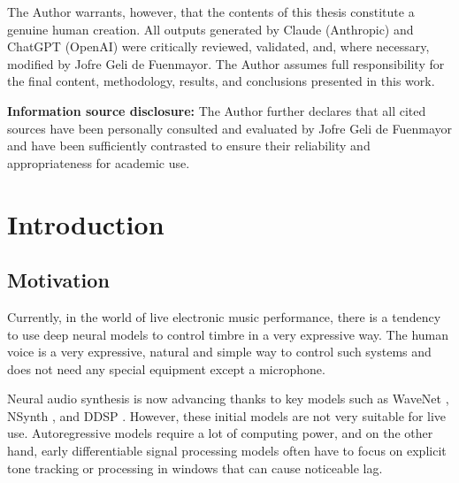 \documentclass[a4paper,11pt,oneside,openany]{book}
\begin{document}
The Author warrants, however, that the contents of this thesis constitute a genuine human creation. All outputs generated by Claude (Anthropic) and ChatGPT (OpenAI) were critically reviewed, validated, and, where necessary, modified by Jofre Geli de Fuenmayor. The Author assumes full responsibility for the final content, methodology, results, and conclusions presented in this work.

\textbf{Information source disclosure:} The Author further declares that all cited sources have been personally consulted and evaluated by Jofre Geli de Fuenmayor and have been sufficiently contrasted to ensure their reliability and appropriateness for academic use.

\tableofcontents
\listoffigures
\listoftables

\mainmatter

\chapter{Introduction}\label{chap:intro}

\section{Motivation}\label{sec:motivation}

Currently, in the world of live electronic music performance, there is a tendency to use deep neural models to control timbre in a very expressive way. The human voice is a very expressive, natural and simple way to control such systems and does not need any special equipment except a microphone.

Neural audio synthesis is now advancing thanks to key models such as WaveNet \parencite{vandenoord2016wavenet}, NSynth \parencite{engel2017nsynth}, and DDSP \parencite{engel2020ddsp}. However, these initial models are not very suitable for live use. Autoregressive models require a lot of computing power, and on the other hand, early differentiable signal processing models often have to focus on explicit tone tracking or processing in windows that can cause noticeable lag.
\end{document}
